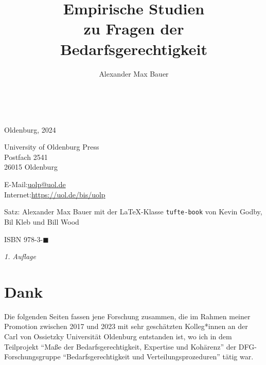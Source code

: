 \documentclass[justified,nobib,nohyper,symmetric,twoside]{tufte-book}
\title{Empirische Studien\\zu Fragen der\\Bedarfsgerechtigkeit}
\date{\empty}
\author{Alexander Max Bauer}
\begin{document}
\frontmatter

\maketitle


\newpage
\begin{fullwidth}
~\vfill
\thispagestyle{empty}
\setlength{\parindent}{0pt}
\setlength{\parskip}{\baselineskip}

\par Oldenburg, 2024

\par University of Oldenburg Press\\
Postfach 2541\\
26015 Oldenburg

\par E-Mail:\hspace{0.4cm}\href{mailto:uolp@uol.de}{uolp@uol.de}\\
Internet:\hspace{0.2cm}\href{https://uol.de/bis/uolp}{https://uol.de/bis/uolp}

\par Satz: Alexander Max Bauer mit der \LaTeX{}-Klasse \texttt{tufte-book} von Kevin Godby, Bil Kleb und Bill Wood

\par ISBN 978-3-$\blacksquare$

\par\textit{1. Auflage}
\end{fullwidth}


\tableofcontents



\chapter*{Dank}\label{ch:dank}
Die folgenden Seiten fassen jene Forschung zusammen, die im Rahmen meiner Promotion zwischen 2017 und 2023 mit sehr geschätzten Kolleg*innen an der Carl von Ossietzky Universität Oldenburg entstanden ist, wo ich in dem Teilprojekt \enquote{Maße der Bedarfsgerechtigkeit, Expertise und Kohärenz} der DFG-Forschungsgruppe \enquote{Bedarfsgerechtigkeit und Verteilungsprozeduren} tätig war.
\end{document}
